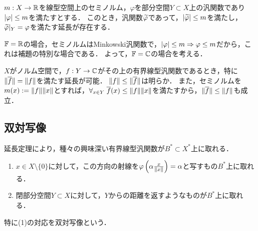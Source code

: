 \documentclass[uplatex,dvipdfmx]{jsreport}
\begin{document}
\begin{theorem}
    $m:X\to\mathbb{R}$を線型空間上のセミノルム，$\varphi$を部分空間$Y\subset X$上の汎関数であり$\lvert\varphi\rvert\le m$を満たすとする．
    このとき，汎関数$\widetilde{\varphi}$であって，$\lvert\widetilde{\varphi}\rvert\le m$を満たし，$\widetilde{\varphi}|_Y=\varphi$を満たす延長が存在する．
\end{theorem}
\begin{Proof}
    $\mathbb{F}=\mathbb{R}$の場合，セミノルムはMinkowski汎関数で，$\lvert\varphi\rvert\le m\Rightarrow\varphi\le m$だから，これは補題の特別な場合である．
    よって，$\mathbb{F}=\mathbb{C}$の場合を考える．
\end{Proof}
\begin{remarks}[有界線型汎関数の延長]
    $X$がノルム空間で，$f:Y\to\mathbb{C}$がその上の有界線型汎関数であるとき，特に$\|\overline{f}\|=\|f\|$を満たす延長が可能．
    $\|f\|\le\|\overline{f}\|$は明らか．
    また，セミノルムを$m(x):=\|f\|\|x\|$とすれば，$\forall_{x\in Y}\;\overline{f}(x)\le\|f\|\|x\|$を満たすから，$\|\overline{f}\|\le\|f\|$も成立．
\end{remarks}

\subsection{双対写像}

\begin{tcolorbox}[colframe=ForestGreen, colback=ForestGreen!10!white,breakable,colbacktitle=ForestGreen!40!white,coltitle=black,fonttitle=\bfseries\sffamily,
title=]
    延長定理により，種々の興味深い有界線型汎関数が$B^*\subset X^*$上に取れる．
    \begin{enumerate}
        \item $x\in X\setminus\{0\}$に対して，この方向の射線を$\varphi\left(\alpha\frac{x}{\|x\|}\right)=\alpha$と写すもの$B^*$上に取れる．
        \item 閉部分空間$Y\subset X$に対して，$Y$からの距離を返すようなものが$B^*$上に取れる．
    \end{enumerate}
    特に(1)の対応を双対写像という\cite{Brezis}．
\end{tcolorbox}
\end{document}
